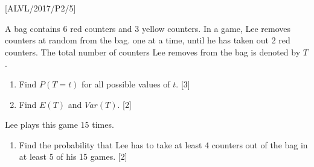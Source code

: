 \item {[}ALVL/2017/P2/5{]}

A bag contains 6 red counters and 3 yellow counters. In a game, Lee
removes counters at random from the bag. one at a time, until he has
taken out 2 red counters. The total number of counters Lee removes
from the bag is denoted by $T$. 
\begin{enumerate}
\item Find $P\left(T=t\right)$ for all possible values of $t$. \hfill{}{[}3{]} 
\item Find $E\left(T\right)$ and $Var\left(T\right)$.\hfill{} {[}2{]} 
\end{enumerate}
Lee plays this game 15 times. 
\begin{enumerate}
\item Find the probability that Lee has to take at least 4 counters out
of the bag in at least 5 of his 15 games.\hfill{} {[}2{]}
\end{enumerate}
